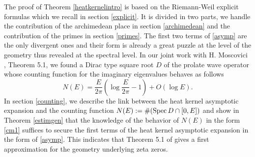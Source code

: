 \documentclass[reqno,12pt]{amsart}
\def\Sp{{\rm Spec}\,}
\begin{document}
The proof of Theorem \ref{heatkernelintro} is based on the Riemann-Weil explicit formulas which we recall in section \ref{explicit}. It is divided in two parts, we handle the contribution of the archimedean place in section \ref{archimedean} and the contribution of the primes in section \ref{primes}.\newline
The first two terms of \eqref{asymp} are the only divergent ones and their form is already a great puzzle at the level of the geometry thus revealed at the spectral level. In our joint work with H. Moscovici \cite{CM}, Theorem 5.1, we found a Dirac type square root $D$ of the prolate wave operator whose counting function for the imaginary eigenvalues  behaves as follows
 \begin{equation}\label{cm1}
 	N(E)=\frac {E}{2\pi}\left(\log \frac {E}{2\pi}-1 \right)+O(\log E).
 \end{equation}
In section \ref{counting}, we describe the link between the heat kernel asymptotic expansion and the counting function $N(E):=\#(\Sp D\cap [0,E])$ and show in Theorem \ref{estimgen} that the knowledge of the behavior of $N(E)$ in the form \eqref{cm1} suffices to secure the first terms of the heat kernel asymptotic expansion in  the form of \eqref{asymp}. This indicates that Theorem 5.1 of  \cite{CM} gives a first approximation for the geometry underlying zeta zeros.
\end{document}
